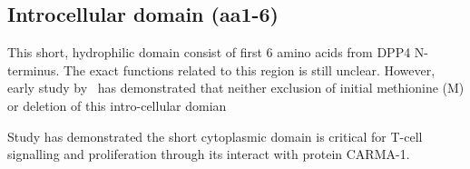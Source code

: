 \subsection{Introcellular domain (aa1-6)}

This short, hydrophilic domain consist of first 6 amino acids from DPP4 N-terminus. The exact functions related to this region is still unclear. However, early study by~\citet{Hong1990} has demonstrated that neither exclusion of initial methionine (M) or deletion of this intro-cellular domian 

Study has demonstrated the short cytoplasmic domain is critical for T-cell signalling and proliferation through its interact with protein CARMA-1. \cite{Ohnuma_2007}